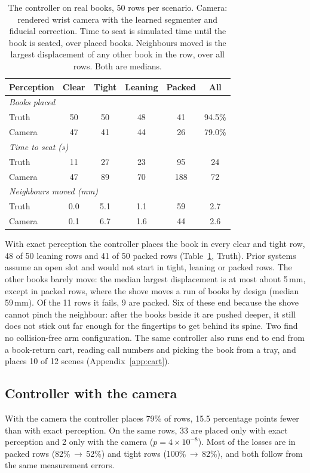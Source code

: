 \documentclass{article}
\begin{document}
\begin{table}[t]
\centering
\caption{The controller on real books, 50 rows per scenario. Camera: rendered wrist camera with the
learned segmenter and fiducial correction. Time to seat is simulated time until the book is seated, over
placed books. Neighbours moved is the largest displacement of any other book in the row, over all rows.
Both are medians.}
\label{tab:main}
\begin{tabular}{lccccc}
\toprule
Perception & Clear & Tight & Leaning & Packed & All \\
\midrule
\multicolumn{6}{l}{\emph{Books placed}} \\
Truth  & 50 & 50 & 48 & 41 & 94.5\% \\
Camera & 47 & 41 & 44 & 26 & 79.0\% \\
\midrule
\multicolumn{6}{l}{\emph{Time to seat (s)}} \\
Truth  & 11 & 27 & 23 &  95 & 24 \\
Camera & 47 & 89 & 70 & 188 & 72 \\
\midrule
\multicolumn{6}{l}{\emph{Neighbours moved (mm)}} \\
Truth  & 0.0 & 5.1 & 1.1 & 59 & 2.7 \\
Camera & 0.1 & 6.7 & 1.6 & 44 & 2.6 \\
\bottomrule
\end{tabular}
\end{table}

With exact perception the controller places the book in every clear and tight row, 48 of 50 leaning
rows and 41 of 50 packed rows (Table~\ref{tab:main}, Truth). Prior
systems~\citep{sygo2023pbbm, liu2026residual} assume an open slot and would not start in tight, leaning or
packed rows. The other books barely move: the median largest displacement is at most about 5\,mm, except
in packed rows, where the shove moves a run of books by design (median 59\,mm). Of the 11 rows it fails, 9
are packed. Six of these end because the shove cannot pinch the neighbour: after the books beside it are
pushed deeper, it still does not stick out far enough for the fingertips to get behind its spine. Two find
no collision-free arm configuration. The same controller also
runs end to end from a book-return cart, reading call numbers and picking the book from a tray, and places
10 of 12 scenes (Appendix~\ref{app:cart}).

\subsection{Controller with the camera}
With the camera the controller places 79\% of rows, 15.5 percentage points fewer than with exact
perception. On the same rows, 33 are placed only with exact perception and 2 only with the camera
($p = 4 \times 10^{-8}$). Most of the losses are in packed rows (82\%\,$\to$\,52\%) and tight rows
(100\%\,$\to$\,82\%), and both follow from the same measurement errors.
\end{document}
